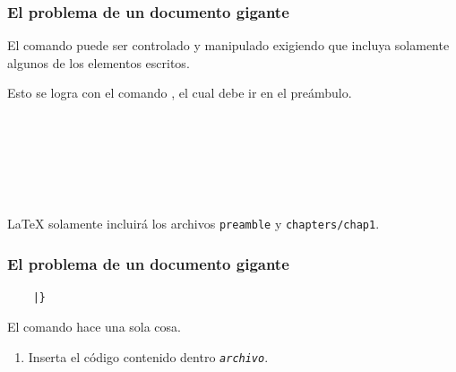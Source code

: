 \documentclass[12pt,aspectratio=169,ignorenonframetext]{ltxbeamer}
\begin{document}
\begin{frame}[fragile]
\frametitle{El problema de un documento gigante}

El comando \texttt{} puede ser controlado y manipulado exigiendo que incluya solamente algunos de los elementos escritos.

Esto se logra con el comando \texttt{}, el cual debe ir en el preámbulo.

\pause

\begin{verbatim}






\end{verbatim}

{\lmr\LaTeX} solamente incluirá los archivos \texttt{preamble} y \texttt{chapters/chap1}.
\end{frame}





\begin{frame}[fragile]
\frametitle{El problema de un documento gigante}

\begin{verbatim}
    |}
\end{verbatim}

\pause

El comando \texttt{} hace una sola cosa.

\begin{enumerate}
    \item Inserta el código contenido dentro \texttt{\textit{archivo}}.
\end{enumerate}
\end{frame}





\end{document}
